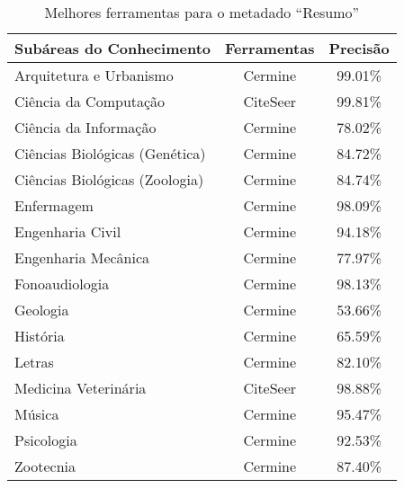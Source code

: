\begin{table}[h!]
    \caption{Melhores ferramentas para o metadado ``Resumo''}
    \begin{center}
        \begin{tabular}{|l|c|c|}
            \hline 
            \textbf{Subáreas do Conhecimento} & \textbf{Ferramentas} & \textbf{Precisão} \\ 
            \hline 
            Arquitetura e Urbanismo & Cermine & 99.01\% \\ \hline
            Ciência da Computação & CiteSeer & 99.81\% \\ \hline
            Ciência da Informação & Cermine & 78.02\% \\ \hline
            Ciências Biológicas (Genética) & Cermine & 84.72\% \\ \hline
            Ciências Biológicas (Zoologia) & Cermine & 84.74\% \\ \hline
            Enfermagem & Cermine & 98.09\% \\ \hline
            Engenharia Civil & Cermine & 94.18\% \\ \hline
            Engenharia Mecânica & Cermine & 77.97\% \\ \hline
            Fonoaudiologia & Cermine & 98.13\% \\ \hline
            Geologia & Cermine & 53.66\% \\ \hline
            História & Cermine & 65.59\% \\ \hline
            Letras & Cermine & 82.10\% \\ \hline
            Medicina Veterinária & CiteSeer & 98.88\% \\ \hline
            Música & Cermine & 95.47\% \\ \hline
            Psicologia & Cermine & 92.53\% \\ \hline
            Zootecnia & Cermine & 87.40\% \\ \hline
        \end{tabular}
    \end{center}
    \label{tab:areas-abstract-tools}
\end{table}

